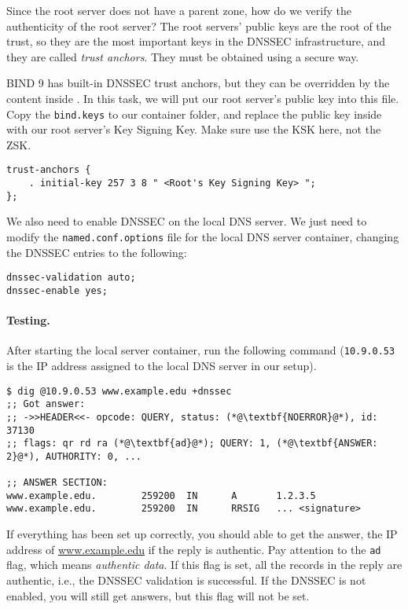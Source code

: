 Since the root server does not have a parent zone, how do we verify the authenticity 
of the root server?  The root servers' public keys are the root of the trust, so they are 
the most important keys in the DNSSEC infrastructure, and they are called \textit{trust
anchors}. They must be obtained using a secure way. 

BIND 9 has built-in DNSSEC trust anchors, but they can be 
overridden by the content inside .  
In this task, we will put our root server's public key 
into this file. Copy the \texttt{bind.keys} to our container folder,
and replace the public key inside with our root server's 
Key Signing Key. Make sure use the KSK here, not the ZSK. 


\begin{lstlisting}
trust-anchors {
    . initial-key 257 3 8 " <Root's Key Signing Key> ";
};
\end{lstlisting}

We also need to enable DNSSEC on the local DNS server.
We just need to
modify the \texttt{named.conf.options} file for the local DNS
server container, changing the DNSSEC entries to the following:

\begin{lstlisting}
dnssec-validation auto;
dnssec-enable yes;
\end{lstlisting}



\paragraph{Testing.} After starting the local server container, run the 
following command (\texttt{10.9.0.53} is the IP address 
assigned to the local DNS server in our setup).

\begin{lstlisting}
$ dig @10.9.0.53 www.example.edu +dnssec
;; Got answer:
;; ->>HEADER<<- opcode: QUERY, status: (*@\textbf{NOERROR}@*), id: 37130
;; flags: qr rd ra (*@\textbf{ad}@*); QUERY: 1, (*@\textbf{ANSWER: 2}@*), AUTHORITY: 0, ...

;; ANSWER SECTION:
www.example.edu.        259200  IN      A       1.2.3.5
www.example.edu.        259200  IN      RRSIG   ... <signature>
\end{lstlisting}

If everything has been set up correctly, you should able to get the 
answer, the IP address of \url{www.example.edu} if the reply 
is authentic. Pay attention to the \texttt{ad} flag, which
means \textit{authentic data}. If this flag is set, all the records in the
reply are authentic, i.e., the DNSSEC validation is successful.
If the DNSSEC is not enabled, you will still get answers, but 
this flag will not be set.

